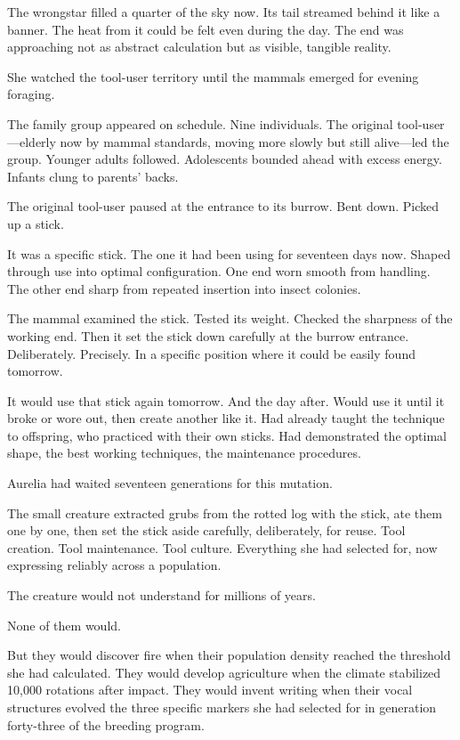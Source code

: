The wrongstar filled a quarter of the sky now. Its tail streamed behind it like a banner. The heat from it could be felt even during the day. The end was approaching not as abstract calculation but as visible, tangible reality.

She watched the tool-user territory until the mammals emerged for evening foraging.

\scenebreak

The family group appeared on schedule. Nine individuals. The original tool-user—elderly now by mammal standards, moving more slowly but still alive—led the group. Younger adults followed. Adolescents bounded ahead with excess energy. Infants clung to parents' backs.

The original tool-user paused at the entrance to its burrow. Bent down. Picked up a stick.

It was a specific stick. The one it had been using for seventeen days now. Shaped through use into optimal configuration. One end worn smooth from handling. The other end sharp from repeated insertion into insect colonies.

The mammal examined the stick. Tested its weight. Checked the sharpness of the working end. Then it set the stick down carefully at the burrow entrance. Deliberately. Precisely. In a specific position where it could be easily found tomorrow.

It would use that stick again tomorrow. And the day after. Would use it until it broke or wore out, then create another like it. Had already taught the technique to offspring, who practiced with their own sticks. Had demonstrated the optimal shape, the best working techniques, the maintenance procedures.

Aurelia had waited seventeen generations for this mutation.

\scenebreak

The small creature extracted grubs from the rotted log with the stick, ate them one by one, then set the stick aside carefully, deliberately, for reuse. Tool creation. Tool maintenance. Tool culture. Everything she had selected for, now expressing reliably across a population.

The creature would not understand for millions of years.

None of them would.

But they would discover fire when their population density reached the threshold she had calculated. They would develop agriculture when the climate stabilized 10,000 rotations after impact. They would invent writing when their vocal structures evolved the three specific markers she had selected for in generation forty-three of the breeding program.

